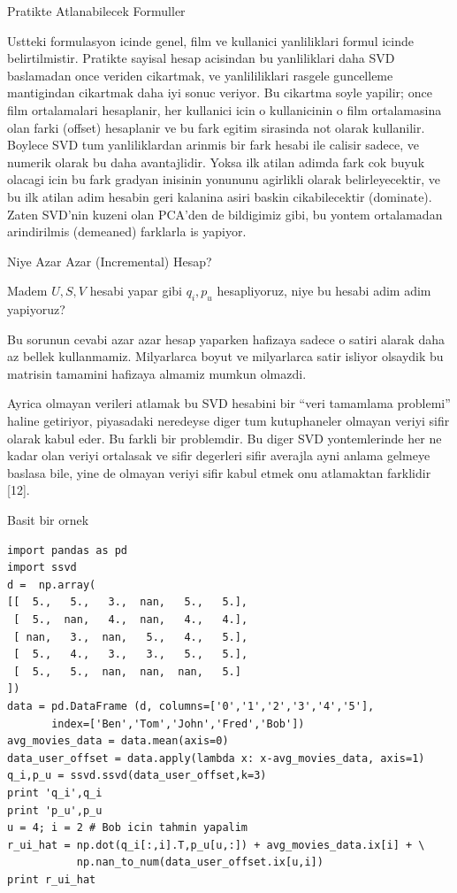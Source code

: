 \documentclass[12pt,fleqn]{article}\usepackage{../common}
\begin{document}
Pratikte Atlanabilecek Formuller

Ustteki formulasyon icinde genel, film ve kullanici yanliliklari formul
icinde belirtilmistir. Pratikte sayisal hesap acisindan bu yanliliklari
daha SVD baslamadan once veriden cikartmak, ve yanlililiklari rasgele
guncelleme mantigindan cikartmak daha iyi sonuc veriyor. Bu cikartma soyle
yapilir; once film ortalamalari hesaplanir, her kullanici icin o
kullanicinin o film ortalamasina olan farki (offset) hesaplanir ve bu fark
egitim sirasinda not olarak kullanilir. Boylece SVD tum yanliliklardan
arinmis bir fark hesabi ile calisir sadece, ve numerik olarak bu daha
avantajlidir. Yoksa ilk atilan adimda fark cok buyuk olacagi icin bu fark
gradyan inisinin yonununu agirlikli olarak belirleyecektir, ve bu ilk
atilan adim hesabin geri kalanina asiri baskin cikabilecektir
(dominate). Zaten SVD'nin kuzeni olan PCA'den de bildigimiz gibi, bu yontem
ortalamadan arindirilmis (demeaned) farklarla is yapiyor.

Niye Azar Azar (Incremental) Hesap? 

Madem $U,S,V$ hesabi yapar gibi $q_i,p_u$ hesapliyoruz, niye bu hesabi adim
adim yapiyoruz? 

Bu sorunun cevabi azar azar hesap yaparken hafizaya sadece o satiri alarak
daha az bellek kullanmamiz. Milyarlarca boyut ve milyarlarca satir isliyor
olsaydik bu matrisin tamamini hafizaya almamiz mumkun olmazdi. 

Ayrica olmayan verileri atlamak bu SVD hesabini bir ``veri tamamlama
problemi'' haline getiriyor, piyasadaki neredeyse diger tum kutuphaneler
olmayan veriyi sifir olarak kabul eder. Bu farkli bir problemdir. Bu diger
SVD yontemlerinde her ne kadar olan veriyi ortalasak ve sifir degerleri
sifir averajla ayni anlama gelmeye baslasa bile, yine de olmayan veriyi
sifir kabul etmek onu atlamaktan farklidir [12]. 

Basit bir ornek

\begin{verbatim}
import pandas as pd
import ssvd
d =  np.array(
[[  5.,   5.,   3.,  nan,   5.,   5.],
 [  5.,  nan,   4.,  nan,   4.,   4.],
 [ nan,   3.,  nan,   5.,   4.,   5.],
 [  5.,   4.,   3.,   3.,   5.,   5.],
 [  5.,   5.,  nan,  nan,  nan,   5.]
])
data = pd.DataFrame (d, columns=['0','1','2','3','4','5'],
       index=['Ben','Tom','John','Fred','Bob'])
avg_movies_data = data.mean(axis=0)
data_user_offset = data.apply(lambda x: x-avg_movies_data, axis=1)
q_i,p_u = ssvd.ssvd(data_user_offset,k=3)
print 'q_i',q_i
print 'p_u',p_u
u = 4; i = 2 # Bob icin tahmin yapalim
r_ui_hat = np.dot(q_i[:,i].T,p_u[u,:]) + avg_movies_data.ix[i] + \
           np.nan_to_num(data_user_offset.ix[u,i])
print r_ui_hat
\end{verbatim}
\end{document}
